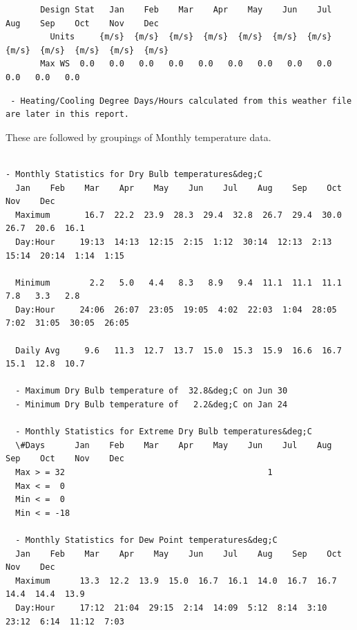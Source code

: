 \begin{lstlisting}
       Design Stat   Jan    Feb    Mar    Apr    May    Jun    Jul    Aug    Sep    Oct    Nov    Dec
         Units     {m/s}  {m/s}  {m/s}  {m/s}  {m/s}  {m/s}  {m/s}  {m/s}  {m/s}  {m/s}  {m/s}  {m/s}
       Max WS  0.0   0.0   0.0   0.0   0.0   0.0   0.0   0.0   0.0   0.0   0.0   0.0
\end{lstlisting}

\begin{lstlisting}
 - Heating/Cooling Degree Days/Hours calculated from this weather file are later in this report.
\end{lstlisting}

These are followed by groupings of Monthly temperature data.

\begin{lstlisting}

- Monthly Statistics for Dry Bulb temperatures&deg;C
  Jan    Feb    Mar    Apr    May    Jun    Jul    Aug    Sep    Oct    Nov    Dec   
  Maximum       16.7  22.2  23.9  28.3  29.4  32.8  26.7  29.4  30.0  26.7  20.6  16.1 
  Day:Hour     19:13  14:13  12:15  2:15  1:12  30:14  12:13  2:13  15:14  20:14  1:14  1:15 

  Minimum        2.2   5.0   4.4   8.3   8.9   9.4  11.1  11.1  11.1   7.8   3.3   2.8 
  Day:Hour     24:06  26:07  23:05  19:05  4:02  22:03  1:04  28:05  7:02  31:05  30:05  26:05 

  Daily Avg     9.6   11.3  12.7  13.7  15.0  15.3  15.9  16.6  16.7  15.1  12.8  10.7  

  - Maximum Dry Bulb temperature of  32.8&deg;C on Jun 30
  - Minimum Dry Bulb temperature of   2.2&deg;C on Jan 24

  - Monthly Statistics for Extreme Dry Bulb temperatures&deg;C
  \#Days      Jan    Feb    Mar    Apr    May    Jun    Jul    Aug    Sep    Oct    Nov    Dec   
  Max > = 32                                         1                                        
  Max < =  0                                                                                  
  Min < =  0                                                                                  
  Min < = -18                                                                                  

  - Monthly Statistics for Dew Point temperatures&deg;C
  Jan    Feb    Mar    Apr    May    Jun    Jul    Aug    Sep    Oct    Nov    Dec   
  Maximum      13.3  12.2  13.9  15.0  16.7  16.1  14.0  16.7  16.7  14.4  14.4  13.9  
  Day:Hour     17:12  21:04  29:15  2:14  14:09  5:12  8:14  3:10  23:12  6:14  11:12  7:03 


\end{lstlisting}
